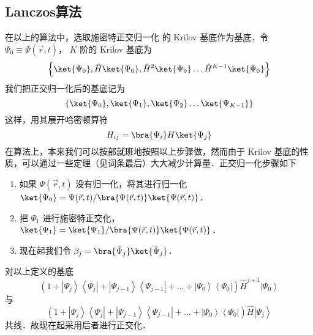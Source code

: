 \subsection{Lanczos算法}
在以上的算法中，选取施密特正交归一化 %
的 Krilov 基底作为基底．令 $\Psi_0 \equiv \Psi(\vec r, t)$，  $K$ 阶的 Krilov 基底为
 \begin{equation}
\left\{ \ket{\Psi_0}, \hat H \ket{\Psi_0}, \hat H^2 \ket{\Psi_0} \dots \hat H^{K-1} \ket{\Psi_0} \right\}
\end{equation}
我们把正交归一化后的基底记为
 \begin{equation}
\left\{ \ket{\Psi_0}, \ket{\Psi_1}, \ket{\Psi_2} \dots \ket{\Psi_{K-1}} \right\}
\end{equation}
这样，用其展开哈密顿算符
\begin{equation}
H_{ij}=\bra{\Psi_i} H \ket{\Psi_j}
\end{equation}
在算法上，本来我们可以按部就班地按照以上步骤做，然而由于 Krilov 基底的性质，可以通过一些定理（见词条最后）大大减少计算量．正交归一化步骤如下

\begin{enumerate}
\item 如果 $\Psi(\vec r,t)$ 没有归一化，将其进行归一化 $\ket{\Psi_0}=\Psi(\vec r,t)/\bra{\Psi(\vec r,t)}\ket{\Psi(\vec r,t)}$．
\item 把 $\Psi_1$ 进行施密特正交化， $\ket{\Psi_1}=\ket{\Psi_1}/\bra{\Psi(\vec r,t)}\ket{\Psi(\vec r,t)}$．  %
\item 现在起我们令 $\beta_j = \bra{\tilde\Psi_j}\ket{\tilde\Psi_j}$． %
\end{enumerate}

{\noindent {}}
对以上定义的基底
\begin{equation}
\left( {1 + \left| {{\Psi _j}} \right\rangle \left\langle {{\Psi _j}} \right| + \left| {{\Psi _{j - 1}}} \right\rangle \left\langle {{\Psi _{j - 1}}} \right| + ... + \left| {{\Psi _0}} \right\rangle \left\langle {{\Psi _0}} \right|} \right){\hat H^{j + 1}}\left| {{\Psi _0}} \right\rangle
\end{equation}
与
\begin{equation}
\left( {1 + \left| {{\Psi _j}} \right\rangle \left\langle {{\Psi _j}} \right| + \left| {{\Psi _{j - 1}}} \right\rangle \left\langle {{\Psi _{j - 1}}} \right| + ... + \left| {{\Psi _0}} \right\rangle \left\langle {{\Psi _0}} \right|} \right)\hat H\left| {{\Psi _j}} \right\rangle 
\end{equation}
共线．故现在起采用后者进行正交化．


